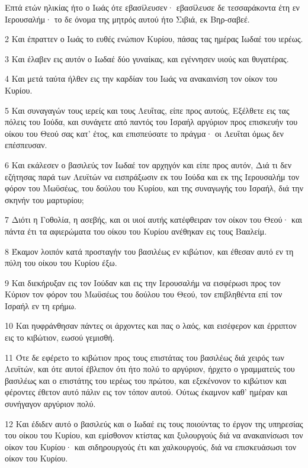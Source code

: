 \par Επτά ετών ηλικίας ήτο ο Ιωάς ότε εβασίλευσεν· εβασίλευσε δε τεσσαράκοντα έτη εν Ιερουσαλήμ· το δε όνομα της μητρός αυτού ήτο Σιβιά, εκ Βηρ-σαβεέ.
\par 2 Και έπραττεν ο Ιωάς το ευθές ενώπιον Κυρίου, πάσας τας ημέρας Ιωδαέ του ιερέως.
\par 3 Και έλαβεν εις αυτόν ο Ιωδαέ δύο γυναίκας, και εγέννησεν υιούς και θυγατέρας.
\par 4 Και μετά ταύτα ήλθεν εις την καρδίαν του Ιωάς να ανακαινίση τον οίκον του Κυρίου.
\par 5 Και συναγαγών τους ιερείς και τους Λευΐτας, είπε προς αυτούς, Εξέλθετε εις τας πόλεις του Ιούδα, και συνάγετε από παντός του Ισραήλ αργύριον προς επισκευήν του οίκου του Θεού σας κατ' έτος, και επισπεύσατε το πράγμα· οι Λευΐται όμως δεν επέσπευσαν.
\par 6 Και εκάλεσεν ο βασιλεύς τον Ιωδαέ τον αρχηγόν και είπε προς αυτόν, Διά τι δεν εζήτησας παρά των Λευϊτών να εισπράξωσιν εκ του Ιούδα και εκ της Ιερουσαλήμ τον φόρον του Μωϋσέως, του δούλου του Κυρίου, και της συναγωγής του Ισραήλ, διά την σκηνήν του μαρτυρίου;
\par 7 Διότι η Γοθολία, η ασεβής, και οι υιοί αυτής κατέφθειραν τον οίκον του Θεού· και πάντα έτι τα αφιερώματα του οίκου του Κυρίου ανέθηκαν εις τους Βααλείμ.
\par 8 Έκαμον λοιπόν κατά προσταγήν του βασιλέως εν κιβώτιον, και έθεσαν αυτό εν τη πύλη του οίκου του Κυρίου έξω.
\par 9 Και διεκήρυξαν εις τον Ιούδαν και εις την Ιερουσαλήμ να εισφέρωσι προς τον Κύριον τον φόρον του Μωϋσέως του δούλου του Θεού, τον επιβληθέντα επί τον Ισραήλ εν τη ερήμω.
\par 10 Και ηυφράνθησαν πάντες οι άρχοντες και πας ο λαός, και εισέφερον και έρριπτον εις το κιβώτιον, εωσού γεμισθή.
\par 11 Ότε δε εφέρετο το κιβώτιον προς τους επιστάτας του βασιλέως διά χειρός των Λευϊτών, και ότε αυτοί έβλεπον ότι ήτο πολύ το αργύριον, ήρχετο ο γραμματεύς του βασιλέως και ο επιστάτης του ιερέως του πρώτου, και εξεκένονον το κιβώτιον και φέροντες έθετον αυτό πάλιν εις τον τόπον αυτού. Ούτως έκαμνον καθ' ημέραν και συνήγαγον αργύριον πολύ.
\par 12 Και έδιδεν αυτό ο βασιλεύς και ο Ιωδαέ εις τους ποιούντας το έργον της υπηρεσίας του οίκου του Κυρίου, και εμίσθονον κτίστας και ξυλουργούς διά να ανακαινίσωσι τον οίκον του Κυρίου· και σιδηρουργούς έτι και χαλκουργούς, διά να επισκευάσωσι τον οίκον του Κυρίου.
